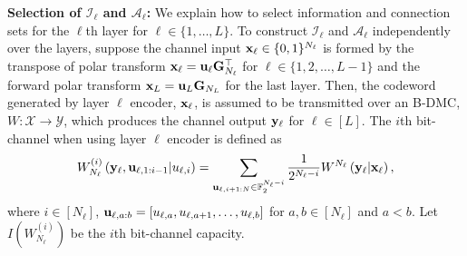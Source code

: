 \documentclass[conference]{IEEEtran}
\begin{document}


 


\vspace{0.1cm}
{\bf Selection of $\mathcal{I}_{\ell}$ and $\mathcal{A}_{\ell}$:}  We explain how to select information and connection sets for the $\ell$th layer for $\ell\in \{1,\ldots, L\}$.  To construct $\mathcal{I}_{\ell}$ and $\mathcal{A}_{\ell}$ independently over the layers, suppose the channel input ${\bf x}_{\ell} \in \{0,1\}^{N_{\ell}}$ is formed by the transpose of polar transform ${\bf x}_{\ell}={\bf u}_{\ell}{\bf G}_{N_{\ell}}^{\top}$ for $\ell\in \{1,2,\ldots, L-1\}$ and the forward polar transform ${\bf x}_{L}={\bf u}_{L}{\bf G}_{N_{L}}$ for the last layer.  Then,  the codeword generated by layer $\ell$ encoder, ${\bf x}_{\ell}$, is assumed to be transmitted over an B-DMC, $W:  \mathcal{X}\rightarrow \mathcal{Y}$, which produces the channel output ${\bf y}_{\ell}$ for $\ell\in [L]$.  The $i$th bit-channel when using layer $\ell$ encoder is defined as
\begin{align}
    W_{N_{\ell}}^{(i)}\left({\bf y}_{\ell}, {\bf u}_{\ell,1:i-1} | u_{\ell,i}\right) = \sum_{{\bf u}_{\ell, i+1:N} \in \mathbb{F}_2^{N_{\ell}-i}} \frac{1}{2^{N_{\ell}-i}} W^{N_{\ell}}\left({\bf y}_{\ell}  | {\bf x}_{
    \ell}\right),
\end{align}
where $i\in [N_{\ell}]$, ${\bf u}_{\ell, a:b}=[u_{\ell,a},u_{\ell, a+1},\ldots, u_{\ell,b}]$ for $a,b\in [N_{\ell}]$ and $a<b$.  Let $I\left(W_{N_{\ell}}^{(i)}\right)$ be the $i$th bit-channel capacity.  
\end{document}
